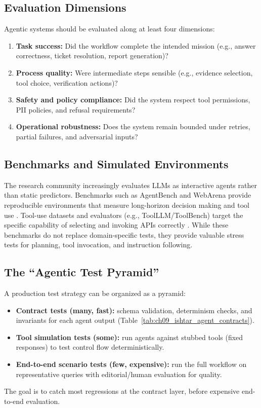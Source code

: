 \subsection{Evaluation Dimensions}
Agentic systems should be evaluated along at least four dimensions:
\begin{enumerate}[leftmargin=1.5em, itemsep=2pt]
  \item \textbf{Task success:} Did the workflow complete the intended mission (e.g., answer correctness, ticket resolution, report generation)?
  \item \textbf{Process quality:} Were intermediate steps sensible (e.g., evidence selection, tool choice, verification actions)?
  \item \textbf{Safety and policy compliance:} Did the system respect tool permissions, PII policies, and refusal requirements?
  \item \textbf{Operational robustness:} Does the system remain bounded under retries, partial failures, and adversarial inputs?
\end{enumerate}

\subsection{Benchmarks and Simulated Environments}
The research community increasingly evaluates LLMs as interactive agents rather than static predictors.
Benchmarks such as AgentBench and WebArena provide reproducible environments that measure long-horizon decision making and tool use \cite{Liu2023AgentBench,Zhou2023WebArena}.
Tool-use datasets and evaluators (e.g., ToolLLM/ToolBench) target the specific capability of selecting and invoking APIs correctly \cite{Qin2023ToolLLM}.
While these benchmarks do not replace domain-specific tests, they provide valuable stress tests for planning, tool invocation, and instruction following.

\subsection{The ``Agentic Test Pyramid''}
A production test strategy can be organized as a pyramid:
\begin{itemize}
  \item \textbf{Contract tests (many, fast):} schema validation, determinism checks, and invariants for each agent output (Table~\ref{tab:ch09_ishtar_agent_contracts}).
  \item \textbf{Tool simulation tests (some):} run agents against stubbed tools (fixed responses) to test control flow deterministically.
  \item \textbf{End-to-end scenario tests (few, expensive):} run the full workflow on representative queries with editorial/human evaluation for quality.
\end{itemize}
The goal is to catch most regressions at the contract layer, before expensive end-to-end evaluation.

